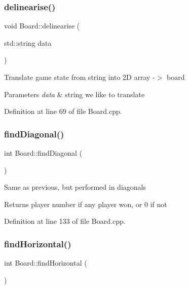 \subsubsection{\texorpdfstring{delinearise()}{delinearise()}}
{\footnotesize\ttfamily void Board\+::delinearise (\begin{DoxyParamCaption}\item[{std\+::string}]{data }\end{DoxyParamCaption})\hspace{0.3cm}{\ttfamily [private]}}

Translate game state from string into 2D array -\/$>$ board 
\begin{DoxyParams}{Parameters}
{\em data} & string we like to translate \\
\hline
\end{DoxyParams}


Definition at line 69 of file Board.\+cpp.

\mbox{\label{classBoard_a99cff26f921e228dc11c381747381ced}} 
\subsubsection{\texorpdfstring{find\+Diagonal()}{findDiagonal()}}
{\footnotesize\ttfamily int Board\+::find\+Diagonal (\begin{DoxyParamCaption}{ }\end{DoxyParamCaption})\hspace{0.3cm}{\ttfamily [private]}}

Same as previous, but performed in diagonals \begin{DoxyReturn}{Returns}
player number if any player won, or 0 if not 
\end{DoxyReturn}


Definition at line 133 of file Board.\+cpp.

\mbox{\label{classBoard_a2f984f83124db1b1df386ef9deff6a24}} 
\subsubsection{\texorpdfstring{find\+Horizontal()}{findHorizontal()}}
{\footnotesize\ttfamily int Board\+::find\+Horizontal (\begin{DoxyParamCaption}{ }\end{DoxyParamCaption})\hspace{0.3cm}{\ttfamily [private]}}

